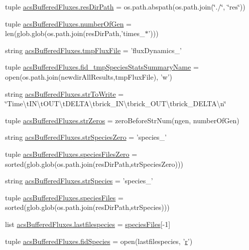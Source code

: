 \begin{DoxyCompactItemize}
\item 
tuple \hyperlink{a00124_abc625ab1aeed5741a02bbaccfbee5c06}{acs\-Buffered\-Fluxes.\-res\-Dir\-Path} = os.\-path.\-abspath(os.\-path.\-join(\char`\"{}./\char`\"{}, \char`\"{}res\char`\"{}))
\item 
tuple \hyperlink{a00124_acd3059fa3a61438f739193dc80f23b80}{acs\-Buffered\-Fluxes.\-number\-Of\-Gen} = len(glob.\-glob(os.\-path.\-join(res\-Dir\-Path,'times\-\_\-$\ast$')))
\item 
string \hyperlink{a00124_a170166907641e54151f8d83d51420165}{acs\-Buffered\-Fluxes.\-tmp\-Flux\-File} = 'flux\-Dynamics\-\_\-'
\item 
tuple \hyperlink{a00124_a88cbb3d14405daf2c6df49cf769fd0d2}{acs\-Buffered\-Fluxes.\-fid\-\_\-tmp\-Species\-Stats\-Summary\-Name} = open(os.\-path.\-join(newdir\-All\-Results,tmp\-Flux\-File), 'w')
\item 
string \hyperlink{a00124_af89a0c5bd58d5bd9787225c1c9aeab8b}{acs\-Buffered\-Fluxes.\-str\-To\-Write} = \char`\"{}Time\textbackslash{}t\-I\-N\textbackslash{}t\-O\-U\-T\textbackslash{}t\-D\-E\-L\-T\-A\textbackslash{}tbrick\-\_\-\-I\-N\textbackslash{}tbrick\-\_\-\-O\-U\-T\textbackslash{}tbrick\-\_\-\-D\-E\-L\-T\-A\textbackslash{}n\char`\"{}
\item 
tuple \hyperlink{a00124_abfa8fbc48a0ad5b6dff6914d6052b2b6}{acs\-Buffered\-Fluxes.\-str\-Zeros} = zero\-Before\-Str\-Num(ngen, number\-Of\-Gen)
\item 
string \hyperlink{a00124_a658920d97b6df23e672e290d362033b4}{acs\-Buffered\-Fluxes.\-str\-Species\-Zero} = 'species\-\_\-'
\item 
tuple \hyperlink{a00124_a8c18127c32adcc1a3403749a047270e5}{acs\-Buffered\-Fluxes.\-species\-Files\-Zero} = sorted(glob.\-glob(os.\-path.\-join(res\-Dir\-Path,str\-Species\-Zero)))
\item 
string \hyperlink{a00124_a36518d8de93502466a6d4b2e62eb7734}{acs\-Buffered\-Fluxes.\-str\-Species} = 'species\-\_\-'
\item 
tuple \hyperlink{a00124_ae41c9dafcdeb581e70eeb889d16c6551}{acs\-Buffered\-Fluxes.\-species\-Files} = sorted(glob.\-glob(os.\-path.\-join(res\-Dir\-Path,str\-Species)))
\item 
list \hyperlink{a00124_a887b4124ed717643d4e79b6d9597109f}{acs\-Buffered\-Fluxes.\-lastfilespecies} = \hyperlink{a00028_af5703745c2c2a6af7f62da460994d9c2}{species\-Files}\mbox{[}-\/1\mbox{]}
\item 
tuple \hyperlink{a00124_ad38778cd180f00344e8a8d68511f56fd}{acs\-Buffered\-Fluxes.\-fid\-Species} = open(lastfilespecies, '\hyperlink{a00031_ac862e7284527eb913b1351c8bfb8e079}{r}')

\end{DoxyCompactItemize}
